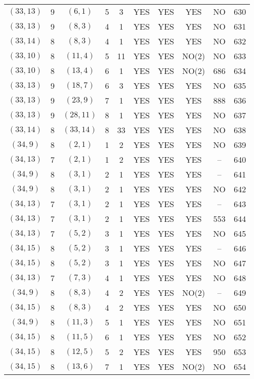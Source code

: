 \begin{longtable}{|c|c|c|c|c|c|c|c|c|c|}
$(33, 13)$ & 9 & $(6, 1)$ & 5 & 3 & YES & YES & YES & NO & 630\\
$(33, 13)$ & 9 & $(8, 3)$ & 4 & 1 & YES & YES & YES & NO & 631\\
$(33, 14)$ & 8 & $(8, 3)$ & 4 & 1 & YES & YES & YES & NO & 632\\
$(33, 10)$ & 8 & $(11, 4)$ & 5 & 11 & YES & YES & NO(2) & NO & 633\\
$(33, 10)$ & 8 & $(13, 4)$ & 6 & 1 & YES & YES & NO(2) & 686 & 634\\
$(33, 13)$ & 9 & $(18, 7)$ & 6 & 3 & YES & YES & YES & NO & 635\\
$(33, 13)$ & 9 & $(23, 9)$ & 7 & 1 & YES & YES & YES & 888 & 636\\
$(33, 13)$ & 9 & $(28, 11)$ & 8 & 1 & YES & YES & YES & NO & 637\\
$(33, 14)$ & 8 & $(33, 14)$ & 8 & 33 & YES & YES & YES & NO & 638\\
$(34, 9)$ & 8 & $(2, 1)$ & 1 & 2 & YES & YES & YES & NO & 639\\
$(34, 13)$ & 7 & $(2, 1)$ & 1 & 2 & YES & YES & YES & -- & 640\\
$(34, 9)$ & 8 & $(3, 1)$ & 2 & 1 & YES & YES & YES & -- & 641\\
$(34, 9)$ & 8 & $(3, 1)$ & 2 & 1 & YES & YES & YES & NO & 642\\
$(34, 13)$ & 7 & $(3, 1)$ & 2 & 1 & YES & YES & YES & -- & 643\\
$(34, 13)$ & 7 & $(3, 1)$ & 2 & 1 & YES & YES & YES & 553 & 644\\
$(34, 13)$ & 7 & $(5, 2)$ & 3 & 1 & YES & YES & YES & NO & 645\\
$(34, 15)$ & 8 & $(5, 2)$ & 3 & 1 & YES & YES & YES & -- & 646\\
$(34, 15)$ & 8 & $(5, 2)$ & 3 & 1 & YES & YES & YES & NO & 647\\
$(34, 13)$ & 7 & $(7, 3)$ & 4 & 1 & YES & YES & YES & NO & 648\\
$(34, 9)$ & 8 & $(8, 3)$ & 4 & 2 & YES & YES & NO(2) & -- & 649\\
$(34, 15)$ & 8 & $(8, 3)$ & 4 & 2 & YES & YES & YES & NO & 650\\
$(34, 9)$ & 8 & $(11, 3)$ & 5 & 1 & YES & YES & YES & NO & 651\\
$(34, 15)$ & 8 & $(11, 5)$ & 6 & 1 & YES & YES & YES & NO & 652\\
$(34, 15)$ & 8 & $(12, 5)$ & 5 & 2 & YES & YES & YES & 950 & 653\\
$(34, 15)$ & 8 & $(13, 6)$ & 7 & 1 & YES & YES & NO(2) & NO & 654\\

\end{longtable}
